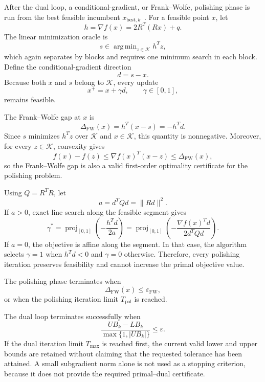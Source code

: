 \documentclass[12pt]{article}
\newcommand{\Kset}{\mathcal{K}}
\DeclareMathOperator*{\argmin}{arg\,min}
\DeclareMathOperator{\proj}{proj}
\begin{document}
After the dual loop, a conditional-gradient, or Frank--Wolfe, polishing phase is run from the best feasible incumbent $x_{\mathrm{best},k}$~\cite{frank1956algorithm}. For a feasible
point $x$, let
\[
h=\nabla f(x)=2R^T(Rx)+q.
\]
The linear minimization oracle is
\begin{equation}
s
\in
\argmin_{z\in\Kset}h^Tz,
\label{eq:fw-oracle}
\end{equation}
which again separates by blocks and requires one minimum search in
each block. Define the conditional-gradient direction
\[
d=s-x.
\]
Because both $x$ and $s$ belong to $\Kset$, every update
\[
x^+=x+\gamma d,
\qquad
\gamma\in[0,1],
\]
remains feasible.

The Frank--Wolfe gap at $x$ is
\begin{equation}
\Delta_{\mathrm{FW}}(x)
=
h^T(x-s)
=
-h^Td.
\label{eq:fw-gap}
\end{equation}
Since $s$ minimizes $h^Tz$ over $\Kset$ and $x\in\Kset$, this
quantity is nonnegative. Moreover, for every $z\in\Kset$, convexity
gives
\[
f(x)-f(z)
\le
\nabla f(x)^T(x-z)
\le
\Delta_{\mathrm{FW}}(x),
\]
so the Frank--Wolfe gap is also a valid first-order optimality
certificate for the polishing problem.

Using $Q=R^TR$, let
\[
a=d^TQd=\|Rd\|^2.
\]
If $a>0$, exact line search along the feasible segment gives
\begin{equation}
\gamma^*
=
\proj_{[0,1]}
\left(
-\frac{h^Td}{2a}
\right)
=
\proj_{[0,1]}
\left(
-\frac{\nabla f(x)^Td}{2d^TQd}
\right).
\label{eq:fw-line-search}
\end{equation}
If $a=0$, the objective is affine along the segment. In that case,
the algorithm selects $\gamma=1$ when $h^Td<0$ and $\gamma=0$
otherwise. Therefore, every polishing iteration preserves feasibility
and cannot increase the primal objective value.

The polishing phase terminates when
\begin{equation}
\Delta_{\mathrm{FW}}(x)
\le
\varepsilon_{\mathrm{FW}},
\label{eq:fw-stop}
\end{equation}
or when the polishing iteration limit $T_{\mathrm{pol}}$ is reached.

The dual loop terminates successfully when
\begin{equation}
\frac{UB_k-LB_k}
{\max\{1,|UB_k|\}}
\le
\varepsilon.
\label{eq:gap-stop}
\end{equation}
If the dual iteration limit $T_{\max}$ is reached first, the current
valid lower and upper bounds are retained without claiming that the
requested tolerance has been attained. A small subgradient norm alone
is not used as a stopping criterion, because it does not provide the
required primal--dual certificate.
\end{document}
